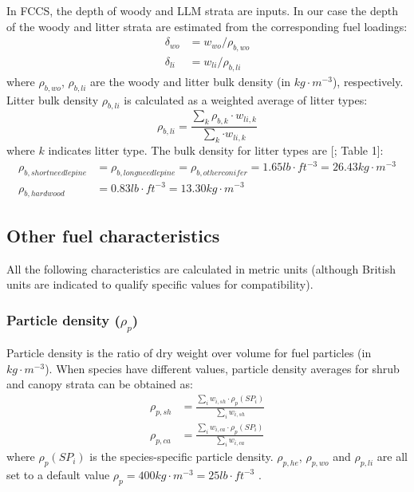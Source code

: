 \documentclass[]{book}
\begin{document}
In FCCS, the depth of woody and LLM strata are inputs. In our case the depth of the woody and litter strata are estimated from the corresponding fuel loadings:
\begin{eqnarray}
\delta_{wo} &= w_{wo}/\rho_{b, wo}\\
\delta_{li} &= w_{li}/\rho_{b, li}
\end{eqnarray}
where \(\rho_{b, wo}\), \(\rho_{b, li}\) are the woody and litter bulk density (in \(kg\cdot m^{-3}\)), respectively. Litter bulk density \(\rho_{b,li}\) is calculated as a weighted average of litter types:
\begin{equation}
 \rho_{b,li} = \frac{\sum_{k}{ \rho_{b,k}\cdot w_{li,k}}}{\sum_{k} {\cdot w_{li,k}}}
\end{equation}
where \(k\) indicates litter type. The bulk density for litter types are {[}\citet{Prichard2013}; Table 1{]}:
\begin{eqnarray}
\rho_{b,shortneedlepine} &= \rho_{b,longneedlepine} = \rho_{b,otherconifer}= 1.65 lb\cdot ft^{-3} = 26.43 kg\cdot m^{-3}\\
\rho_{b,hardwood} &= 0.83 lb\cdot ft^{-3} = 13.30  kg\cdot m^{-3}
\end{eqnarray}

\hypertarget{other-fuel-characteristics}{%
\subsection{Other fuel characteristics}\label{other-fuel-characteristics}}

All the following characteristics are calculated in metric units (although British units are indicated to qualify specific values for compatibility).

\hypertarget{particle-density-rho_p}{%
\subsubsection{\texorpdfstring{Particle density (\(\rho_{p}\))}{Particle density (\textbackslash{}rho\_\{p\})}}\label{particle-density-rho_p}}

Particle density is the ratio of dry weight over volume for fuel particles (in \(kg\cdot m^{-3}\)). When species have different values, particle density averages for shrub and canopy strata can be obtained as:
\begin{eqnarray}
\rho_{p, sh} &= \frac{\sum_{i}{w_{i,sh} \cdot \rho_p(SP_i)}}{\sum_{i}{w_{i,sh}}}\\
\rho_{p, ca} &= \frac{\sum_{i}{w_{i,ca} \cdot \rho_p(SP_i)}}{\sum_{i}{w_{i,ca}}}
\end{eqnarray}
where \(\rho_p(SP_i)\) is the species-specific particle density. \(\rho_{p, he}\), \(\rho_{p, wo}\) and \(\rho_{p, li}\) are all set to a default value \(\rho_{p} = 400 kg\cdot m^{-3}= 25 lb\cdot ft^{-3}\) \citep{Prichard2013}.
\end{document}

